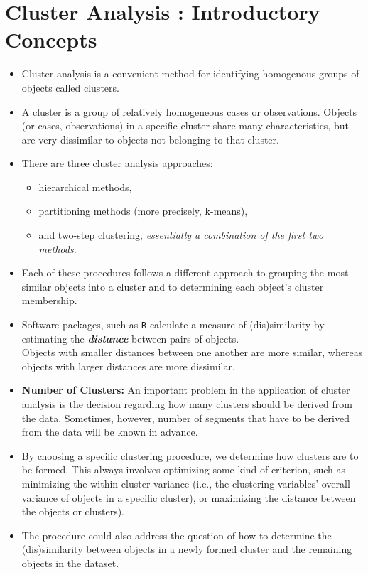 \documentclass[SKLCluster.tex]{subfiles}
\begin{document}
\section{Cluster Analysis :  Introductory Concepts}







\begin{itemize}
\item Cluster analysis is a convenient method for identifying homogenous groups of
objects called clusters. 
\item A cluster is a group of relatively homogeneous cases or observations. Objects (or cases, observations) in a specific cluster share
many characteristics, but are very dissimilar to objects not belonging to that cluster.
\item  There are three cluster analysis approaches: 
\begin{itemize}
  \item hierarchical methods,
  \item partitioning methods (more precisely, k-means), 
  \item and two-step clustering,
\textit{essentially a combination of the first two methods.}
\end{itemize}
\item Each of these procedures
follows a different approach to grouping the most similar objects into a cluster and
to determining each object’s cluster membership. 
\item Software packages, such as \texttt{R} calculate a measure
of (dis)similarity by estimating the \textbf{\textit{distance}} between pairs of objects. \\ Objects with
smaller distances between one another are more similar, whereas objects with larger
distances are more dissimilar.
\item \textbf{Number of Clusters:} An important problem in the application of cluster analysis is the decision
regarding how many clusters should be derived from the data. 
Sometimes, however,
number of segments that have to be derived from the data will be known in advance.
\item
By choosing a specific clustering procedure, we determine how clusters are to be
formed. This always involves optimizing some kind of criterion, such as minimizing
the within-cluster variance (i.e., the clustering variables’ overall variance of
objects in a specific cluster), or maximizing the distance between the objects or
clusters). 
\item The procedure could also address the question of how to determine the
(dis)similarity between objects in a newly formed cluster and the remaining objects
in the dataset.
\end{itemize}
\newpage
\end{document}
